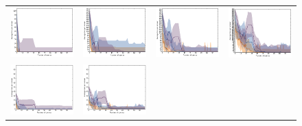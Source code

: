 \documentclass{article}
\renewcommand\[{\begin{equation}}
\renewcommand\]{\end{equation}}
\begin{document}
\begin{figure}[b]
\begin{tabular}{cccc}
        \\
        \includegraphics[width=12em]{figures/synthetic_3_uniform_sparse_cv1_loss} &
        \includegraphics[width=12em]{figures/synthetic_4_uniform_sparse_cv1_loss} &
        \includegraphics[width=12em]{figures/synthetic_5_uniform_sparse_cv1_loss} &
        \includegraphics[width=12em]{figures/synthetic_6_uniform_sparse_cv1_loss}
        \\
        \includegraphics[width=12em]{figures/synthetic_3_normal_cv1_loss} &
        \includegraphics[width=12em]{figures/synthetic_4_normal_cv1_loss} &

\end{tabular}
\end{figure}
\end{document}
